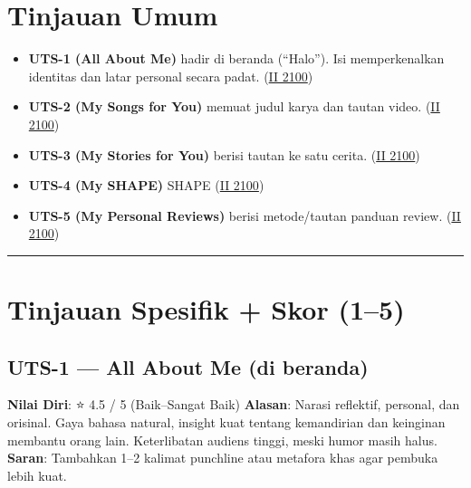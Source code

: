 \documentclass[
  letterpaper,
  DIV=11,
  numbers=noendperiod]{scrreprt}
\providecommand{\tightlist}{%
  \setlength{\itemsep}{0pt}\setlength{\parskip}{0pt}}\usepackage{longtable,booktabs,array}
\begin{document}
\section{Tinjauan Umum}\label{tinjauan-umum}

\begin{itemize}
\tightlist
\item
  \textbf{UTS-1 (All About Me)} hadir di beranda (``Halo''). Isi
  memperkenalkan identitas dan latar personal secara padat.
  (\href{https://azrl.wordpress.com/2010/04/06/empati-kecerdasan-tertinggi/?utm_source=chatgpt.com}{II
  2100})
\item
  \textbf{UTS-2 (My Songs for You)} memuat judul karya dan tautan video.
  (\href{https://azrl.wordpress.com/2008/05/25/the-journey-4/?utm_source=chatgpt.com}{II
  2100})
\item
  \textbf{UTS-3 (My Stories for You)} berisi tautan ke satu cerita.
  (\href{https://azrl.wordpress.com/?utm_source=chatgpt.com}{II 2100})
\item
  \textbf{UTS-4 (My SHAPE)} SHAPE
  (\href{https://azrl.wordpress.com/2008/12/01/family/?utm_source=chatgpt.com}{II
  2100})
\item
  \textbf{UTS-5 (My Personal Reviews)} berisi metode/tautan panduan
  review.
  (\href{https://azrl.wordpress.com/2008/07/29/caltech/?utm_source=chatgpt.com}{II
  2100})
\end{itemize}

\begin{center}\rule{0.5\linewidth}{0.5pt}\end{center}

\section{Tinjauan Spesifik + Skor
(1--5)}\label{tinjauan-spesifik-skor-15}

\subsection{UTS-1 --- All About Me (di
beranda)}\label{uts-1-all-about-me-di-beranda}

\textbf{Nilai Diri}: ⭐ 4.5 / 5 (Baik--Sangat Baik) \textbf{Alasan}:
Narasi reflektif, personal, dan orisinal. Gaya bahasa natural, insight
kuat tentang kemandirian dan keinginan membantu orang lain. Keterlibatan
audiens tinggi, meski humor masih halus. \textbf{Saran}: Tambahkan 1--2
kalimat punchline atau metafora khas agar pembuka lebih kuat.
\end{document}
